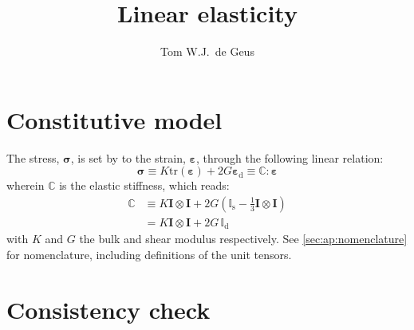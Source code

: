 \documentclass[namecite, fleqn]{goose-article}
\title{Linear elasticity}
\author{Tom W.J.\ de Geus}
\begin{document}
\maketitle

\section{Constitutive model}

The stress, $\bm{\sigma}$, is set by to the strain, $\bm{\varepsilon}$,
through the following linear relation:
\begin{equation}
    \bm{\sigma}
    \equiv K \mathrm{tr}\left( \bm{\varepsilon} \right)
    + 2 G \bm{\varepsilon}_\mathrm{d}
    \equiv \mathbb{C} : \bm{\varepsilon}
\end{equation}
wherein $\mathbb{C}$ is the elastic stiffness, which reads:
\begin{align}
    \mathbb{C}
    &\equiv K \bm{I} \otimes \bm{I}
    + 2 G (\mathbb{I}_\mathrm{s} - \tfrac{1}{3} \bm{I} \otimes \bm{I} )
    \\
    &= K \bm{I} \otimes \bm{I}
    + 2 G \, \mathbb{I}_\mathrm{d}
\end{align}
with $K$ and $G$ the bulk and shear modulus respectively.
See \cref{sec:ap:nomenclature} for nomenclature, including definitions of the unit tensors.

\section{Consistency check}
\end{document}

